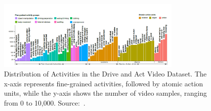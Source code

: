 \begin{figure}[h]
\begin{center}
\includegraphics[width=0.8\textwidth]{Images_Thesis/daa_images/Capture_Activities_thesis.PNG}
\end{center}
\caption[Distribution of activities offered by Drive and Act video dataset.]{Distribution of Activities in the Drive and Act Video Dataset. The x-axis represents fine-grained activities, followed by atomic action units, while the y-axis shows the number of video samples, ranging from 0 to 10,000. Source:~\citep{martin2019drive_and_act_2019_iccv}.}
\label{fig:driveandact_activities}
\end{figure}

